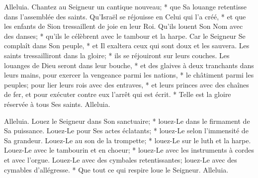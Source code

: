 Alleluia. Chantez au Seigneur un cantique nouveau; * que Sa louange retentisse dans l'assemblée des saints.
Qu'Israël se réjouisse en Celui qui l'a créé, * et que les enfants de Sion tressaillent de joie en leur Roi.
Qu'ils louent Son Nom avec des danses; * qu'ils le célèbrent avec le tambour et la harpe.
Car le Seigneur Se complaît dans Son peuple, * et Il exaltera ceux qui sont doux et les sauvera.
Les saints tressailliront dans la gloire; * ils se réjouiront sur leurs couches.
Les louanges de Dieu seront dans leur bouche, * et des glaives à deux tranchants dans leurs mains,
pour exercer la vengeance parmi les nations, * le châtiment parmi les peuples;
pour lier leurs rois avec des entraves, * et leurs princes avec des chaînes de fer,
et pour exécuter contre eux l'arrêt qui est écrit. * Telle est la gloire réservée à tous Ses saints. Alleluia.

Alleluia. Louez le Seigneur dans Son sanctuaire; * louez-Le dans le firmament de Sa puissance.
Louez-Le pour Ses actes éclatants; * louez-Le selon l'immensité de Sa grandeur.
Louez-Le au son de la trompette; * louez-Le sur le luth et la harpe.
Louez-Le avec le tambourin et en choeur; * louez-Le avec les instruments à cordes et avec l'orgue.
Louez-Le avec des cymbales retentissantes; louez-Le avec des cymables d'allégresse. * Que tout ce qui respire loue le Seigneur. Alleluia.

